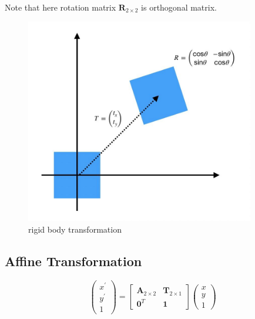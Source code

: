 \documentclass[12pt, a4 paper]{article}
\begin{document}
\indent Note that here rotation matrix $\boldsymbol{R}_{2\times 2}$
is orthogonal matrix.
\begin{figure}[h]
    \centering
    \includegraphics[width=10cm,height=9cm]{rigid body transformation.jpg}
    \caption{rigid body transformation}
\end{figure}

\subsection{Affine Transformation}
\begin{equation}
    \begin{pmatrix}
        x^{\prime} \\ y^{\prime} \\ 1
    \end{pmatrix} = 
    \begin{bmatrix}
        \boldsymbol{A}_{2 \times 2} & \boldsymbol{T}_{2 \times 1}\\
        \boldsymbol{0}^{T} & \boldsymbol{1}
    \end{bmatrix}
    \begin{pmatrix}
        x \\ y \\ 1
    \end{pmatrix}
\end{equation}
\end{document}

